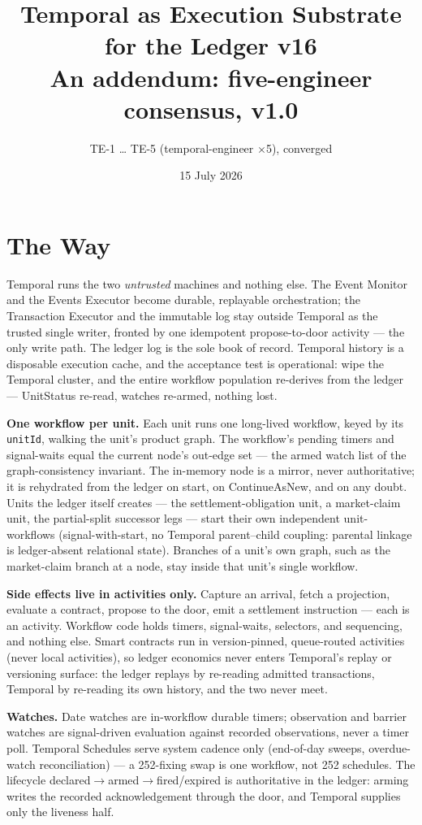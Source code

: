 \documentclass[11pt,a4paper]{article}
\title{\textbf{Temporal as Execution Substrate for the Ledger v16}\\
\large An addendum: five-engineer consensus, v1.0}
\author{TE-1 \ldots{} TE-5 (temporal-engineer $\times$5), converged}
\date{15 July 2026}
\begin{document}
\maketitle

\section{The Way}

Temporal runs the two \emph{untrusted} machines and nothing else. The Event Monitor and
the Events Executor become durable, replayable orchestration; the Transaction Executor
and the immutable log stay outside Temporal as the trusted single writer, fronted by one
idempotent propose-to-door activity --- the only write path. The ledger log is the sole
book of record. Temporal history is a disposable execution cache, and the acceptance
test is operational: wipe the Temporal cluster, and the entire workflow population
re-derives from the ledger --- UnitStatus re-read, watches re-armed, nothing lost.

\textbf{One workflow per unit.} Each unit runs one long-lived workflow, keyed by its
\texttt{unitId}, walking the unit's product graph. The workflow's pending timers and
signal-waits equal the current node's out-edge set --- the armed watch list of the
graph-consistency invariant. The in-memory node is a mirror, never authoritative; it is
rehydrated from the ledger on start, on ContinueAsNew, and on any doubt. Units the
ledger itself creates --- the settlement-obligation unit, a market-claim unit, the
partial-split successor legs --- start their own independent unit-workflows
(signal-with-start, no Temporal parent--child coupling: parental linkage is
ledger-absent relational state). Branches of a unit's own graph, such as the
market-claim branch at a node, stay inside that unit's single workflow.

\textbf{Side effects live in activities only.} Capture an arrival, fetch a projection,
evaluate a contract, propose to the door, emit a settlement instruction --- each is an
activity. Workflow code holds timers, signal-waits, selectors, and sequencing, and
nothing else. Smart contracts run in version-pinned, queue-routed activities (never
local activities), so ledger economics never enters Temporal's replay or versioning
surface: the ledger replays by re-reading admitted transactions, Temporal by re-reading
its own history, and the two never meet.

\textbf{Watches.} Date watches are in-workflow durable timers; observation and barrier
watches are signal-driven evaluation against recorded observations, never a timer poll.
Temporal Schedules serve system cadence only (end-of-day sweeps, overdue-watch
reconciliation) --- a 252-fixing swap is one workflow, not 252 schedules. The lifecycle
declared$\to$armed$\to$fired/expired is authoritative in the ledger: arming writes the
recorded acknowledgement through the door, and Temporal supplies only the liveness half.
\end{document}
